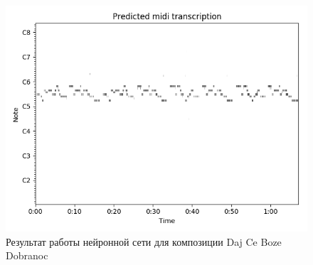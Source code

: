 \begin{figure}
  \centering
    \includegraphics[scale=1]{res/daj-ci-boze-dobranoc-overfit-028-acoustic.png}
  \centering
  \caption{Результат работы нейронной сети для композиции Daj Ce Boze Dobranoc}
    \label{F:daj-pred}
\end{figure}
